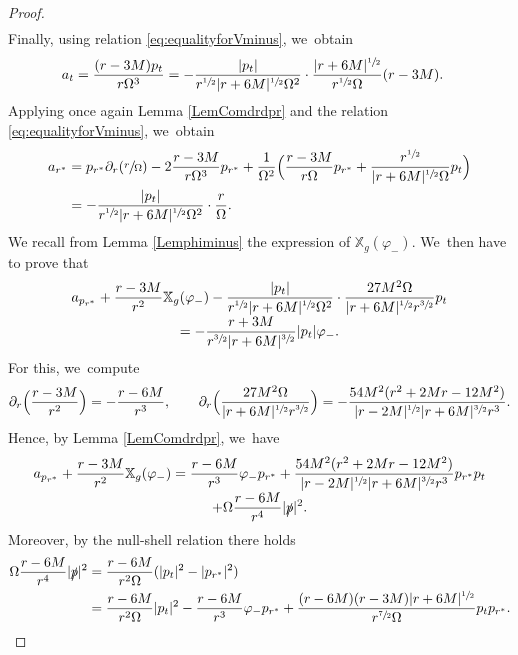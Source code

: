 \documentclass[10pt]{amsart}
\theoremstyle{plain}
\theoremstyle{definition}
\newcommand\T{{\mathbb{X}}}
\begin{document}
\begin{proof}
\begin{multline*}
\end{multline*}
Finally, using relation \eqref{eq:equalityforVminus}, we~obtain\vspace*{-3pt}
\begin{align*}
a_t & = \frac{(r-3M)p_t}{r \Omega^3}= - \frac{|p_t|}{r^{\sfrac{1}{2}}|r+6M|^{\sfrac{1}{2}}\Omega^2} \cdot \frac{|r+6M|^{\sfrac{1}{2}}}{r^{\sfrac{1}{2}}\Omega}(r-3M).
\end{align*}
Applying once again Lemma \ref{LemComdrdpr} and the relation \eqref{eq:equalityforVminus}, we~obtain\vspace*{-3pt}
\begin{align*}
a_{r^*} & =p_{r^*}\partial_{r}(\sfrac{r}{\Omega}) -2\frac{r-3M}{r \Omega^3}p_{r^*}+\frac{1}{\Omega^2}\Bigl(\frac{r-3M}{r\Omega}p_{r^*}+\frac{r^{\sfrac{1}{2}}}{|r+6M|^{\sfrac{1}{2}} \Omega}p_t \Bigr) \\
& = -\frac{|p_t|}{r^{\sfrac{1}{2}}|r+6M|^{\sfrac{1}{2}} \Omega^2}\cdot \frac{r}{\Omega}.
\end{align*}
We recall from Lemma \ref{Lemphiminus} the expression of $\T_g(\varphi_-)$. We~then have to prove that\vspace*{-5pt}
\begin{multline*}
a_{p_{r^*}} +\frac{r-3M}{r^2} \T_g (\varphi_-) - \frac{|p_t|}{r^{\sfrac{1}{2}}|r+6M|^{\sfrac{1}{2}}\Omega^2}\cdot \frac{27M^2 \Omega}{|r+6M|^{\sfrac{1}{2}}r^{\sfrac{3}{2}}}p_t\\[-3pt]
=- \frac{r+3M}{r^{\sfrac{3}{2}}|r+6M|^{\sfrac{3}{2}}}|p_t|\varphi_-.
\end{multline*}
For this, we~compute
\[
\partial_{r} \Bigl(\frac{r-3M}{r^2} \Bigr) = -\frac{r-6M}{r^3}, \qquad\partial_r \Bigl(\frac{27M^2 \Omega}{|r+6M|^{\sfrac{1}{2}}r^{\sfrac{3}{2}}} \Bigr)= -\frac{54M^2(r^2+2Mr-12M^2)}{|r-2M|^{\sfrac{1}{2}} |r+6M|^{\sfrac{3}{2}} r^3}.
\]
Hence, by Lemma \ref{LemComdrdpr}, we~have\vspace*{-5pt}
\begin{multline*} a_{p_{r^*}} +\frac{r-3M}{r^2} \T_g (\varphi_-) = \frac{r-6M}{r^3}\varphi_- p_{r^*}+ \frac{54M^2(r^2+2Mr-12M^2)}{|r-2M|^{\sfrac{1}{2}} |r+6M|^{\sfrac{3}{2}} r^3}p_{r^*} p_t \\[-3pt]
+\Omega \frac{r-6M}{r^4} |\slashed{p}|^2.
\end{multline*}
Moreover, by the null-shell relation there holds
\begin{align*}
\Omega \frac{r-6M}{r^4} |\slashed{p}|^2 & = \frac{r-6M}{r^2 \Omega} (|p_t|^2-|p_{r^*}|^2) \\
& =\frac{r-6M}{r^2 \Omega} |p_t|^2-\frac{r-6M}{r^3 } \varphi_- p_{r^*}+\frac{(r-6M)(r-3M)|r+6M|^{\sfrac{1}{2}}}{r^{\sfrac{7}{2}} \Omega } p_t p_{r^*}.

\end{align*}
\end{proof}
\end{document}
